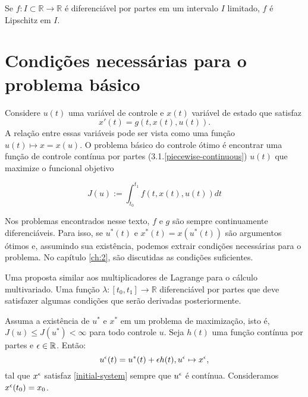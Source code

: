 \begin{exercise}
    Se $f: I \subset \mathbb{R} \to \mathbb{R}$ é diferenciável por partes em
    um intervalo $I$ limitado, $f$ é Lipschitz em $I$.  
\end{exercise}

\section{Condições necessárias para o problema básico} 

Considere $u(t)$ uma variável de controle e $x(t)$ variável de estado que
satisfaz 
\begin{equation}
    \label{initial-system}
    x'(t) = g(t,x(t),u(t)). 
\end{equation}
A relação entre essas variáveis pode ser vista como uma função $u(t) \mapsto x = x(u)$.  O problema básico do controle ótimo é encontrar
uma função de controle contínua por partes (3.1.\ref{piecewise-continuous})
$u(t)$ que maximize o funcional objetivo 

\begin{equation}
    \label{objetivo}
    J(u) := \int_{t_0}^{t_1} f(t,x(t),u(t))dt    
\end{equation}

Nos problemas encontrados nesse texto, $f$ e $g$ são sempre continuamente
diferenciáveis. Para isso, se $u^{*}(t)$ e $x^*(t) = x(u^*(t))$ são
argumentos ótimos e, assumindo sua existência, podemos extrair condições
necessárias para o problema. No capítulo \ref{ch:2}, são discutidas as condições suficientes. 

\begin{definition}
    \label{adjoint-function}
    Uma proposta similar aos multiplicadores de Lagrange para
    o cálculo multivariado. Uma função $\lambda : [t_0,t_1] \to \mathbb{R}$
    diferenciável por partes que deve satisfazer algumas condições que serão
    derivadas posteriormente. 
\end{definition}

Assuma a existência de $u^*$ e $x^*$ em um problema de maximização, isto é, 
$J(u) \leq J(u^*) < \infty$ para todo controle $u$. Seja $h(t)$ uma função
contínua por partes e $\epsilon \in \mathbb{R}$.  Então:
\begin{equation*}
    u^{\epsilon}(t) = u^*(t) + \epsilon h(t), u^{\epsilon} \mapsto x^{\epsilon}, 
\end{equation*}
tal que $x^{\epsilon}$ satisfaz \ref{initial-system} sempre que $u^{\epsilon}$ é contínua. Consideramos $x^{\epsilon}(t_0) = x_0$.

